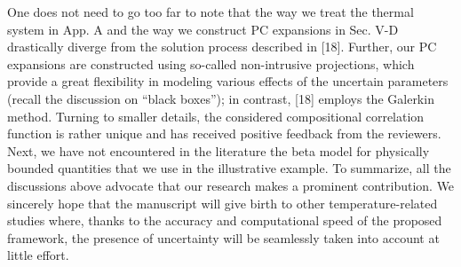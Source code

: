 \begin{authors}
One does not need to go too far to note that the way we treat the thermal system in App. A and the way we construct PC expansions in Sec. V-D drastically diverge from the solution process described in [18].
Further, our PC expansions are constructed using so-called non-intrusive projections, which provide a great flexibility in modeling various effects of the uncertain parameters (recall the discussion on ``black boxes''); in contrast, [18] employs the Galerkin method.
Turning to smaller details, the considered compositional correlation function is rather unique and has received positive feedback from the reviewers.
Next, we have not encountered in the literature the beta model for physically bounded quantities that we use in the illustrative example.
To summarize, all the discussions above advocate that our research makes a prominent contribution.
We sincerely hope that the manuscript will give birth to other temperature-related studies where, thanks to the accuracy and computational speed of the proposed framework, the presence of uncertainty will be seamlessly taken into account at little effort.
\end{authors}

